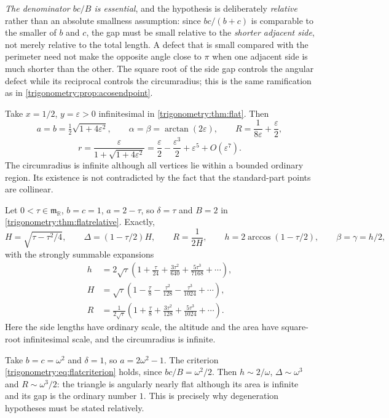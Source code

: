 \documentclass[11pt,letterpaper]{article}
\numberwithin{equation}{section}
\theoremstyle{definition}
\theoremstyle{remark}
\newcommand{\R}{\mathbb R}
\newcommand{\mm}{\mathfrak m}
\newcommand{\eps}{\varepsilon}
\begin{document}
\emph{The denominator $bc/B$ is essential}, and the hypothesis is deliberately \emph{relative}
rather than an absolute smallness assumption: since $bc/(b+c)$ is comparable to the smaller of $b$
and $c$, the gap must be small relative to the \emph{shorter adjacent side}, not merely relative to
the total length. A defect that is small compared with the perimeter need not make the opposite
angle close to $\pi$ when one adjacent side is much shorter than the other. The square root of the
side gap controls the angular defect while its reciprocal controls the circumradius; this is the
same ramification as in \cref{trigonometry:prop:acosendpoint}.

\begin{example}\label{trigonometry:ex:flat}
Take $x=1/2$, $y=\eps>0$ infinitesimal in \cref{trigonometry:thm:flat}. Then
\[
 a=b=\tfrac12\sqrt{1+4\eps^2},\qquad \alpha=\beta=\arctan(2\eps),\qquad
 R=\frac1{8\eps}+\frac\eps2,
\]
\[
 r=\frac\eps{1+\sqrt{1+4\eps^2}}=\frac\eps2-\frac{\eps^3}2+\eps^5+O(\eps^7).
\]
The circumradius is infinite although all vertices lie within a bounded ordinary region. Its
existence is not contradicted by the fact that the standard-part points are collinear.
\end{example}

\begin{example}\label{trigonometry:ex:flatgap}
Let $0<\tau\in\mm_{\R}$, $b=c=1$, $a=2-\tau$, so $\delta=\tau$ and $B=2$ in
\cref{trigonometry:thm:flatrelative}. Exactly,
\[
 H=\sqrt{\tau-\tau^2/4},\qquad \Delta=(1-\tau/2)H,\qquad R=\frac1{2H},
 \qquad h=2\arccos(1-\tau/2),\qquad \beta=\gamma=h/2,
\]
with the strongly summable expansions
\begin{align*}
 h&=2\sqrt\tau\left(1+\frac\tau{24}+\frac{3\tau^2}{640}+\frac{5\tau^3}{7168}+\cdots\right),\\
 H&=\sqrt\tau\left(1-\frac\tau8-\frac{\tau^2}{128}-\frac{\tau^3}{1024}+\cdots\right),\\
 R&=\frac1{2\sqrt\tau}\left(1+\frac\tau8+\frac{3\tau^2}{128}+\frac{5\tau^3}{1024}+\cdots\right).
\end{align*}
Here the side lengths have ordinary scale, the altitude and the area have square-root infinitesimal
scale, and the circumradius is infinite.
\end{example}

\begin{example}
\label{trigonometry:ex:appreciablegap}
Take $b=c=\omega^2$ and $\delta=1$, so $a=2\omega^2-1$. The criterion
\cref{trigonometry:eq:flatcriterion} holds, since $bc/B=\omega^2/2$. Then
$h\sim2/\omega$, $\Delta\sim\omega^3$ and $R\sim\omega^3/2$: the triangle is angularly nearly flat
although its area is infinite and its gap is the ordinary number $1$. This is precisely why
degeneration hypotheses must be stated relatively.
\end{example}
\end{document}
